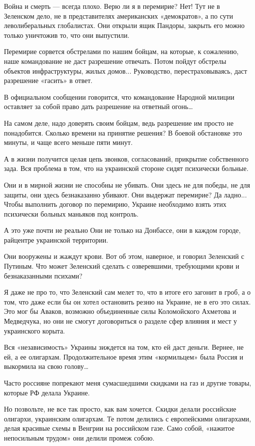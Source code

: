 Война и смерть — всегда плохо. Верю ли я в перемирие?
Нет!
Тут не в Зеленском дело, не в представителях американских «демократов», а по сути леволиберальных глобалистах. Они открыли ящик Пандоры, закрыть его можно только уничтожив то, что они выпустили.

Перемирие сорвется обстрелами по нашим бойцам, на которые, к сожалению, наше командование не даст разрешение отвечать. Потом пойдут обстрелы объектов инфраструктуры, жилых домов...
Руководство, перестраховываясь, даст разрешение «гасить» в ответ.

В официальном сообщении говорится, что командование Народной милиции оставляет за собой право дать разрешение на ответный огонь…

На самом деле, надо доверять своим бойцам, ведь разрешение им просто не понадобится. Сколько времени на принятие решения?
В боевой обстановке это минуты, и чаще всего меньше пяти минут.

А в жизни получится целая цепь звонков, согласований, прикрытие собственного зада.
Вся проблема в том, что на украинской стороне сидят психически больные.

Они и в мирной жизни не способны не убивать.
Они здесь не для победы, не для защиты, они здесь безнаказанно убивают. Они выдержат перемирие?
Да ладно...
Чтобы выполнить договор по перемирию, Украине необходимо взять этих психически больных маньяков под контроль.

А это уже почти не реально
Они не только на Донбассе, они в каждом городе, райцентре украинской территории.

Они вооружены и жаждут крови.
Вот об этом, наверное, и говорил Зеленский с Путиным.
Что может Зеленский сделать с озверевшими, требующими крови и безнаказанными психами?

Я даже не про то, что Зеленский сам мелет то, что в итоге его загонит в гроб, а о том, что даже если бы он хотел остановить резню на Украине, не в его это силах.
Это мог бы Аваков, возможно объединенные силы Коломойского Ахметова и Медведчука, но они не смогут договориться о разделе сфер влияния и мест у украинского корыта.

Вся «независимость» Украины зиждется на том, кто ей даст деньги.
Вернее, не ей, а ее олигархам.
Продолжительное время этим «кормильцем» была Россия и выкормила на свою голову…

Часто россияне попрекают меня сумасшедшими скидками на газ и другие товары, которые РФ делала Украине.

Но позвольте, не все так просто, как вам хочется. Скидки делали российские олигархи, украинским олигархам.
Те потом делились с европейскими олигархами, делая красивые схемы в Венгрии на российском газе. Само собой, «нажитое непосильным трудом» они делили промеж собою.


